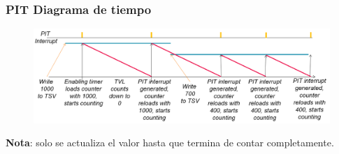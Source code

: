 \documentclass[10.5pt,scale=1.0,t,aspectratio=169,hyperref={pdfpagelabels=false}]{beamer}
\begin{document}
\begin{frame}
	\frametitle{PIT Diagrama de tiempo}
	{\small
	\begin{figure}
		\centering
		\includegraphics[scale=0.6]{03_PITDiagramTime}
	\end{figure}
		
		\textbf{Nota}: solo se actualiza el valor hasta que termina de contar completamente. 	
	}
\end{frame}
\end{document}
